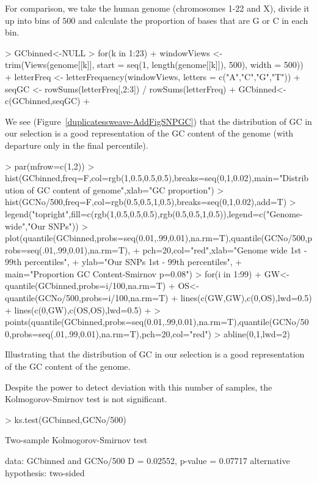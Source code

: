 \documentclass{article}
\begin{document}
For comparison, we take the human genome (chromosomes 1-22 and X), divide it up into bins of $500$ and calculate the proportion of bases that are G or C in each bin.


\begin{Schunk}
\begin{Sinput}
> GCbinned<-NULL
> for(k in 1:23){
+     windowViews <- trim(Views(genome[[k]], start = seq(1, length(genome[[k]]), 500), width = 500))
+     letterFreq <- letterFrequency(windowViews, letters = c("A","C","G","T"))
+     seqGC <- rowSums(letterFreq[,2:3]) / rowSums(letterFreq)
+     GCbinned<-c(GCbinned,seqGC)
+ }
\end{Sinput}
\end{Schunk}

We see (Figure~\ref{duplicatessweave-AddFigSNPGC}) that the distribution of GC in our selection is a good representation of the GC content of the genome (with departure only in the final percentile).


\begin{Schunk}
\begin{Sinput}
> par(mfrow=c(1,2))
> hist(GCbinned,freq=F,col=rgb(1,0.5,0.5,0.5),breaks=seq(0,1,0.02),main="Distribution of GC content of genome",xlab="GC proportion")
> hist(GCNo/500,freq=F,col=rgb(0.5,0.5,1,0.5),breaks=seq(0,1,0.02),add=T)
> legend("topright",fill=c(rgb(1,0.5,0.5,0.5),rgb(0.5,0.5,1,0.5)),legend=c("Genome-wide","Our SNPs"))
> plot(quantile(GCbinned,probs=seq(0.01,.99,0.01),na.rm=T),quantile(GCNo/500,probs=seq(.01,.99,0.01),na.rm=T),
+      pch=20,col="red",xlab="Genome wide 1st - 99th percentiles",
+      ylab="Our SNPs 1st - 99th percentiles",
+      main="Proportion GC Content\nKolmogorov-Smirnov p=0.08")
> for(i in 1:99){
+   GW<-quantile(GCbinned,probs=i/100,na.rm=T)
+   OS<-quantile(GCNo/500,probs=i/100,na.rm=T)
+ lines(c(GW,GW),c(0,OS),lwd=0.5)  
+ lines(c(0,GW),c(OS,OS),lwd=0.5)  
+ }
> points(quantile(GCbinned,probs=seq(0.01,.99,0.01),na.rm=T),quantile(GCNo/500,probs=seq(.01,.99,0.01),na.rm=T),pch=20,col="red")
> abline(0,1,lwd=2)
\end{Sinput}
\end{Schunk}
{Illustrating that the distribution of GC in our selection is a good representation of the GC content of the genome.}

Despite the power to detect deviation with this number of samples, the Kolmogorov-Smirnov test is not significant.

\begin{Schunk}
\begin{Sinput}
> ks.test(GCbinned,GCNo/500)
\end{Sinput}
\begin{Soutput}
	Two-sample Kolmogorov-Smirnov test

data:  GCbinned and GCNo/500
D = 0.02552, p-value = 0.07717
alternative hypothesis: two-sided
\end{Soutput}
\end{Schunk}
\end{document}
